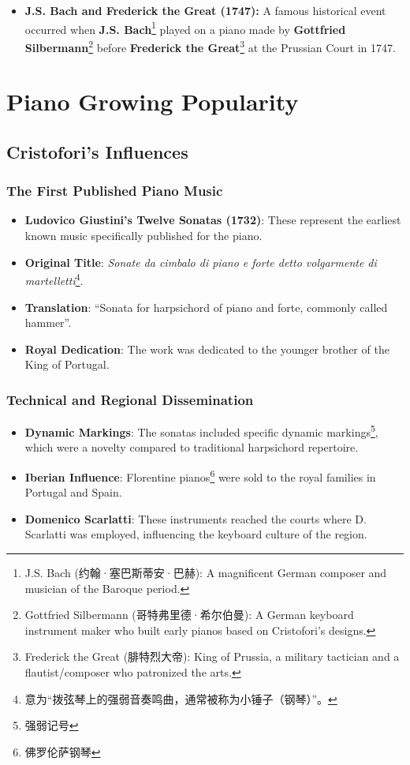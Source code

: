 \documentclass[math,code]{amznotes}
\theoremstyle{remark}
\begin{document}
\begin{itemize}
\begin{itemize}
        \item \textbf{J.S. Bach and Frederick the Great (1747):} A famous historical event occurred when \textbf{J.S. Bach}\footnote{J.S. Bach (约翰·塞巴斯蒂安·巴赫): A magnificent German composer and musician of the Baroque period.} played on a piano made by \textbf{Gottfried Silbermann}\footnote{Gottfried Silbermann (哥特弗里德·希尔伯曼): A German keyboard instrument maker who built early pianos based on Cristofori's designs.} before \textbf{Frederick the Great}\footnote{Frederick the Great (腓特烈大帝): King of Prussia, a military tactician and a flautist/composer who patronized the arts.} at the Prussian Court in 1747.
    \end{itemize}
\end{itemize}

\section{Piano Growing Popularity}

\subsection{Cristofori's Influences}

\subsubsection{The First Published Piano Music}
\begin{itemize}
    \item \textbf{Ludovico Giustini's Twelve Sonatas (1732)}: These represent the earliest known music specifically published for the piano.
    \item \textbf{Original Title}: \textit{Sonate da cimbalo di piano e forte detto volgarmente di martelletti}\footnote{意为“拨弦琴上的强弱音奏鸣曲，通常被称为小锤子（钢琴）”。}.
    \item \textbf{Translation}: ``Sonata for harpsichord of piano and forte, commonly called hammer''.
    \item \textbf{Royal Dedication}: The work was dedicated to the younger brother of the King of Portugal.
\end{itemize}

\subsubsection{Technical and Regional Dissemination}
\begin{itemize}
    \item \textbf{Dynamic Markings}: The sonatas included specific dynamic markings\footnote{强弱记号}, which were a novelty compared to traditional harpsichord repertoire.
    \item \textbf{Iberian Influence}: Florentine pianos\footnote{佛罗伦萨钢琴} were sold to the royal families in Portugal and Spain.
    \item \textbf{Domenico Scarlatti}: These instruments reached the courts where D. Scarlatti was employed, influencing the keyboard culture of the region.
\end{itemize}
\end{document}
